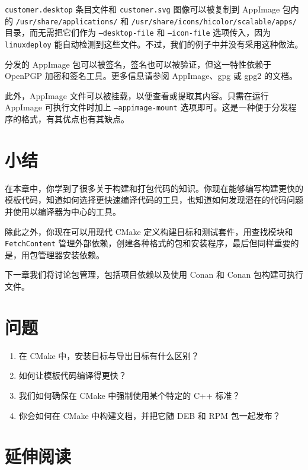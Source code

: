 \texttt{customer.\allowbreak{}desktop} 条目文件和 \texttt{customer.\allowbreak{}svg} 图像可以被复制到 AppImage 包内的 \texttt{/\allowbreak{}usr/\allowbreak{}share/\allowbreak{}applications/\allowbreak{}} 和 \texttt{/\allowbreak{}usr/\allowbreak{}share/\allowbreak{}icons/\allowbreak{}hicolor/\allowbreak{}scalable/\allowbreak{}apps/\allowbreak{}} 目录，而无需把它们作为 \texttt{–desktop-file} 和 \texttt{–icon-file} 选项传入，因为 \texttt{linuxdeploy} 能自动检测到这些文件。不过，我们的例子中并没有采用这种做法。

分发的 AppImage 包可以被签名，签名也可以被验证，但这一特性依赖于 OpenPGP 加密和签名工具。更多信息请参阅 AppImage、gpg 或 gpg2 的文档。

\label{idx:719}
\label{idx:720}
此外，AppImage 文件可以被挂载，以便查看或提取其内容。只需在运行 AppImage 可执行文件时加上 \texttt{--appimage-mount} 选项即可。这是一种便于分发程序的格式，有其优点也有其缺点。

\section{小结}

在本章中，你学到了很多关于构建和打包代码的知识。你现在能够编写构建更快的模板代码，知道如何选择更快速编译代码的工具，也知道如何发现潜在的代码问题并使用以编译器为中心的工具。

除此之外，你现在可以用现代 CMake 定义构建目标和测试套件，用查找模块和 \texttt{Fetch\allowbreak{}Content} 管理外部依赖，创建各种格式的包和安装程序，最后但同样重要的是，用包管理器安装依赖。

下一章我们将讨论包管理，包括项目依赖以及使用 Conan 和 Conan 包构建可执行文件。

\section{问题}

\begin{enumerate}
\item 在 CMake 中，安装目标与导出目标有什么区别？
\item 如何让模板代码编译得更快？
\item 我们如何确保在 CMake 中强制使用某个特定的 C++ 标准？
\item 你会如何在 CMake 中构建文档，并把它随 DEB 和 RPM 包一起发布？
\end{enumerate}

\section{延伸阅读}

